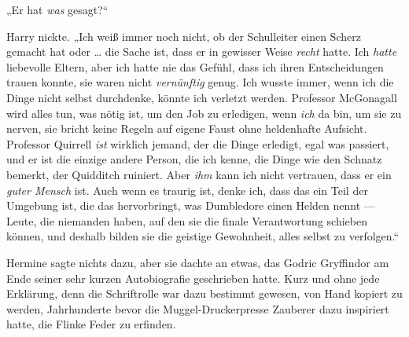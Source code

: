 „Er hat \emph{was} gesagt?“

Harry nickte.
„Ich weiß immer noch nicht, ob der Schulleiter einen Scherz gemacht hat oder … die Sache ist, dass er in gewisser Weise \emph{recht} hatte. Ich \emph{hatte} liebevolle Eltern, aber ich hatte nie das Gefühl, dass ich ihren Entscheidungen trauen konnte, sie waren nicht \emph{vernünftig} genug. Ich wusste immer, wenn ich die Dinge nicht selbst durchdenke, könnte ich verletzt werden. Professor McGonagall wird alles tun, was nötig ist, um den Job zu erledigen, wenn \emph{ich} da bin, um sie zu nerven, sie bricht keine Regeln auf eigene Faust ohne heldenhafte Aufsicht. Professor Quirrell \emph{ist} wirklich jemand, der die Dinge erledigt, egal was passiert, und er ist die einzige andere Person, die ich kenne, die Dinge wie den Schnatz bemerkt, der Quidditch ruiniert. Aber \emph{ihm} kann ich nicht vertrauen, dass er ein \emph{guter Mensch} ist. Auch wenn es traurig ist, denke ich, dass das ein Teil der Umgebung ist, die das hervorbringt, was Dumbledore einen Helden nennt — Leute, die niemanden haben, auf den sie die finale Verantwortung schieben können, und deshalb bilden sie die geistige Gewohnheit, alles selbst zu verfolgen.“

Hermine sagte nichts dazu, aber sie dachte an etwas, das Godric Gryffindor am Ende seiner sehr kurzen Autobiografie geschrieben hatte. Kurz und ohne jede Erklärung, denn die Schriftrolle war dazu bestimmt gewesen, von Hand kopiert zu werden, Jahrhunderte bevor die Muggel-Druckerpresse Zauberer dazu inspiriert hatte, die Flinke Feder zu erfinden.

